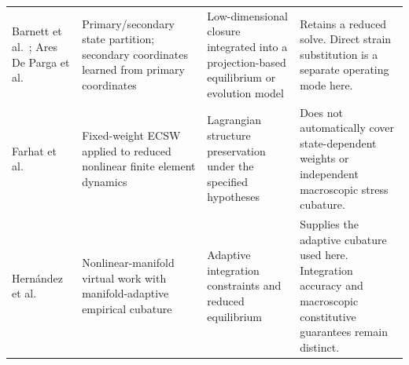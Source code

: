 \begin{longtable}{@{}>{\raggedright\arraybackslash}p{2.6cm}>{\raggedright\arraybackslash}p{4.05cm}>{\raggedright\arraybackslash}p{4.15cm}>{\raggedright\arraybackslash}p{4.85cm}@{}}
\addlinespace
Barnett et al.~\cite{barnett2023}; Ares De Parga et al.~\cite{aresdeparga2026nonlinear}
& Primary/secondary state partition; secondary coordinates learned from primary coordinates
& Low-dimensional closure integrated into a projection-based equilibrium or evolution model
& Retains a reduced solve. Direct strain substitution is a separate operating mode here.\\
\addlinespace
Farhat et al.~\cite{farhat2015}
& Fixed-weight ECSW applied to reduced nonlinear finite element dynamics
& Lagrangian structure preservation under the specified hypotheses
& Does not automatically cover state-dependent weights or independent macroscopic stress cubature.\\
\addlinespace
Hern\'andez et al.~\cite{hernandez2026}
& Nonlinear-manifold virtual work with manifold-adaptive empirical cubature
& Adaptive integration constraints and reduced equilibrium
& Supplies the adaptive cubature used here. Integration accuracy and macroscopic constitutive guarantees remain distinct.\\
\end{longtable}
\endgroup
